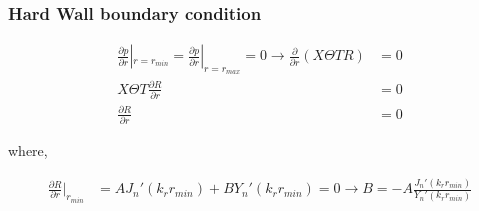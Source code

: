 







\subsubsection{Hard Wall boundary condition}
\begin{align*}
    \frac{\partial p}{\partial r}|_{r = r_{min}}  =\frac{\partial p}{\partial r}|_{r = r_{max}} = 0 \rightarrow 
    \frac{\partial}{\partial r} \left( X\Theta T R \right) &= 0 \\
    X \Theta T\frac{\partial R}{\partial r}  &= 0 \\
    \frac{\partial R}{\partial r}  &= 0 
\end{align*}

where,


\begin{align*} 
    \frac{ \partial R}{\partial r}|_{r_{min}} &= AJ_n'(k_r r_{min}) + B Y_n' (k_r r_{min}) = 0 
    \rightarrow B = -A \frac{J_n'(k_r r_{min})}{Y_n'(k_r r_{min})}
\end{align*}


